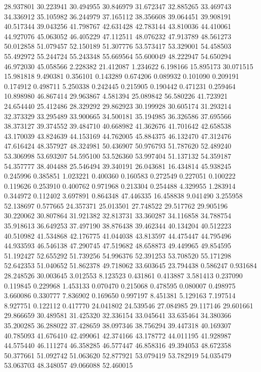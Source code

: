 28.937801
30.223941
30.494955
30.846979
31.672347
32.885265
33.469743
34.336912
35.105982
36.244979
37.165112
38.356608
39.064451
39.908191
40.517344
39.043256
41.798767
42.631428
42.783144
43.810036
44.410061
44.927076
45.063052
46.405229
47.112511
48.076232
47.913789
48.561273
50.012858
51.079457
52.150189
51.307776
53.573417
53.329001
54.458503
55.492972
55.244724
55.243348
55.669564
55.600049
48.222947
54.650294
46.972030
45.058566
2.228382
21.412087
1.234622
6.198166
15.895173
30.071515
15.981818
9.490381
0.356101
0.143289
0.674206
0.089932
0.101090
0.209191
0.174912
0.498711
5.250338
0.242445
0.215905
0.190442
0.471231
0.259464
10.898980
46.867414
29.963867
4.581394
25.089842
56.580226
41.723921
24.654440
25.412486
28.329292
29.862923
30.199928
30.605174
31.293214
32.373329
33.295489
33.900665
34.500181
35.194985
36.326586
37.695566
38.373127
39.374552
39.484710
40.668982
41.362676
41.701642
42.658538
43.170039
43.824639
44.153169
44.762005
45.884375
46.132470
47.312476
47.616424
48.357927
48.324981
50.436907
50.976793
51.787620
52.489240
53.306998
53.693207
54.595100
53.526360
53.997404
51.137132
54.359187
54.357777
38.404488
25.546494
39.340191
26.043681
16.434814
45.938245
0.245996
0.385851
1.023221
0.400360
0.160583
0.272549
0.227051
0.100222
0.119626
0.253910
0.400762
0.971968
0.213304
0.254488
4.329955
1.283914
0.344972
0.112402
3.697891
0.864348
47.446335
16.458838
9.041490
3.255958
52.138697
0.577665
24.357371
25.013501
27.748522
29.517762
29.905196
30.220062
30.807864
31.921382
32.813731
33.360287
34.116858
34.788754
35.918613
36.649253
37.497190
38.876438
39.462344
40.134204
40.512223
40.510982
41.534868
42.176775
41.044038
43.813597
44.475447
44.795496
44.933593
46.546138
47.290745
47.519682
48.658873
49.449965
49.854595
51.192427
52.655292
51.739256
54.996376
52.391253
53.708520
55.171298
52.642353
51.040652
51.862378
49.718062
33.603645
23.794438
0.586247
0.931684
28.248526
30.003645
3.012553
8.123523
0.431861
0.413887
3.581413
0.237090
0.119845
0.229968
1.453133
0.070470
0.215068
0.478595
0.080007
0.498975
3.660086
0.330777
7.836902
0.169650
0.997197
8.451381
5.129163
7.197514
8.927751
0.122112
0.417770
24.041802
24.539546
27.084985
29.117146
29.601661
29.866659
30.489581
31.425320
32.336154
33.045641
33.635464
34.380366
35.200285
36.288022
37.428659
38.097346
38.756294
39.447318
40.169307
40.785093
41.676410
42.499061
42.374166
43.178772
44.011195
41.928987
44.575440
46.111274
46.358285
46.577447
46.858316
49.394053
48.672358
50.377661
51.092742
51.063620
52.877921
53.079419
53.782919
54.035479
53.063703
48.348057
49.066088
52.460015
